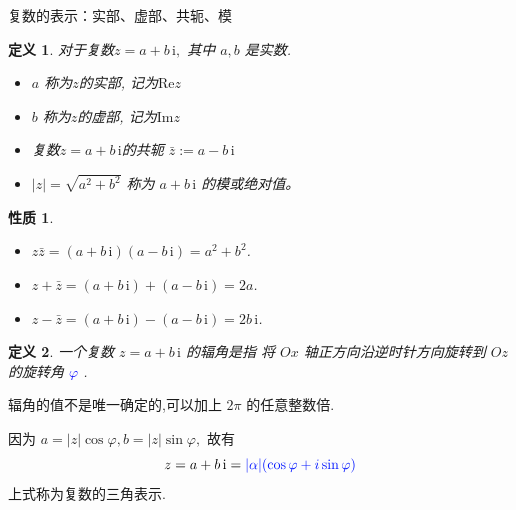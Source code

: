 \documentclass[13pt,punct]{ctexbeamer}
\newtheorem*{defi}{定义}
\newtheorem*{prop}{性质}
\def\i{\, \mathrm{i}}
\newcommand{\blue}{\textcolor{blue}}
\begin{document}
\begin{frame}{复数的表示：实部、虚部、共轭、模}

	\begin{defi}
		对于复数$z=a+b \i,$ 其中 $a, b$ 是实数.

		\begin{itemize}
			\item $a$ 称为$z$的\alert{实部}, 记为$\text{Re} z$

			\item $b$ 称为$z$的\alert{虚部}, 记为$\text{Im}  z$

			\item 复数$z=a+b \i$的\alert{共轭} $\bar{z}:=a-b\i$
			\item  $|z|=\sqrt{a^{2}+b^{2}}$ 称为 $a+b \i$ 的\alert{模}或绝对值。
		\end{itemize}
	\end{defi}
	\begin{prop}
		\begin{itemize}
			\item $z  \bar{z}=(a+b \i)(a-b \i)=a^{2}+b^{2}$.
			\item $z+\bar{z}=(a+b \i)+(a-b \i)=2 a$.
			\item $z-\bar{z}=(a+b \i)-(a-b \i)=2 b \i$.
		\end{itemize}
	\end{prop}
\end{frame}



\begin{frame}
\begin{defi}
一个复数 $z=a+b {\i}$ 的\alert{辐角}是指	将 $Ox$ 轴正方向沿逆时针方向旋转到 $Oz$ 的旋转角 \blue{$\varphi$} .
\end{defi}
     辐角的值不是唯一确定的,可以加上 $2 \pi$ 的任意整数倍.

	因为 $a=|z| \cos \varphi, b=|z| \sin \varphi,$ 故有
	\[
	z=a+b {\i}= \blue{|\alpha|(\cos \varphi+{i} \sin \varphi)}
	\]
	上式称为复数的\alert{三角表示}.
	\begin{center}
	\end{center}
\end{frame}
\end{document}
